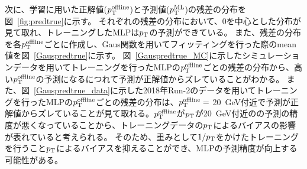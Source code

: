 次に、学習に用いた正解値($p_{\rm{T}}^{\rm{offline}}$)と予測値($p_{\rm{T}}^{\rm{ML}}$)の残差の分布を図~\ref{fig:predtrue}に示す。
それぞれの残差の分布において、0を中心とした分布が見て取れ、トレーニングしたMLPは$p_{\rm{T}}$の予測ができている。
また、残差の分布を各$p_{\rm{T}}^{\rm{offline}}$ごとに作成し、Gaus関数を用いてフィッティングを行った際のmean値を図~\ref{Gauspredtrue}に示す。
図~\ref{Gauspredtrue_MC}に示したシミュレーションデータを用いてトレーニングを行ったMLPの$p_{\rm{T}}^{\rm{offline}}$ごとの残差の分布から、高い$p_{\rm{T}}^{\rm{offline}}$の予測になるにつれて予測が正解値からズレていることがわかる。
また、図~\ref{Gauspredtrue_data}に示した2018年Run-2のデータを用いてトレーニングを行ったMLPの$p_{\rm{T}}^{\rm{offline}}$ごとの残差の分布は、$p_{\rm{T}}^{\rm{offline}}=$ 20~GeV付近で予測が正解値からズレていることが見て取れる。$p_{\rm{T}}^{\rm{offline}}$が$p_{\rm{T}}$が20~GeV付近のの予測の精度が悪くなっていることから、トレーニングデータの$p_{\rm{T}}$によるバイアスの影響が表れていると考えられる。
そのため、重みとして$1/p_{\rm{T}}$をかけたトレーニングを行うこと$p_{\rm{T}}$によるバイアスを抑えることができ、MLPの予測精度が向上する可能性がある。


